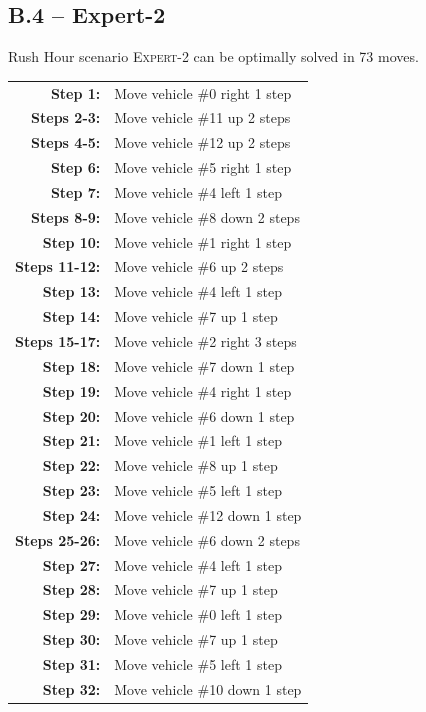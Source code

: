 \subsection*{B.4 -- Expert-2}
\nobreak
\centering Rush Hour scenario \textsc{Expert-2} can be optimally solved in 73 moves.
\begin{longtable}{rl}
\textbf{Step 1:} & Move vehicle \#0 right 1 step \\
\textbf{Steps 2-3:} & Move vehicle \#11 up 2 steps \\
\textbf{Steps 4-5:} & Move vehicle \#12 up 2 steps \\
\textbf{Step 6:} & Move vehicle \#5 right 1 step \\
\textbf{Step 7:} & Move vehicle \#4 left 1 step \\
\textbf{Steps 8-9:} & Move vehicle \#8 down 2 steps \\
\textbf{Step 10:} & Move vehicle \#1 right 1 step \\
\textbf{Steps 11-12:} & Move vehicle \#6 up 2 steps \\
\textbf{Step 13:} & Move vehicle \#4 left 1 step \\
\textbf{Step 14:} & Move vehicle \#7 up 1 step \\
\textbf{Steps 15-17:} & Move vehicle \#2 right 3 steps \\
\textbf{Step 18:} & Move vehicle \#7 down 1 step \\
\textbf{Step 19:} & Move vehicle \#4 right 1 step \\
\textbf{Step 20:} & Move vehicle \#6 down 1 step \\
\textbf{Step 21:} & Move vehicle \#1 left 1 step \\
\textbf{Step 22:} & Move vehicle \#8 up 1 step \\
\textbf{Step 23:} & Move vehicle \#5 left 1 step \\
\textbf{Step 24:} & Move vehicle \#12 down 1 step \\
\textbf{Steps 25-26:} & Move vehicle \#6 down 2 steps \\
\textbf{Step 27:} & Move vehicle \#4 left 1 step \\
\textbf{Step 28:} & Move vehicle \#7 up 1 step \\
\textbf{Step 29:} & Move vehicle \#0 left 1 step \\
\textbf{Step 30:} & Move vehicle \#7 up 1 step \\
\textbf{Step 31:} & Move vehicle \#5 left 1 step \\
\textbf{Step 32:} & Move vehicle \#10 down 1 step \\

\end{longtable}
